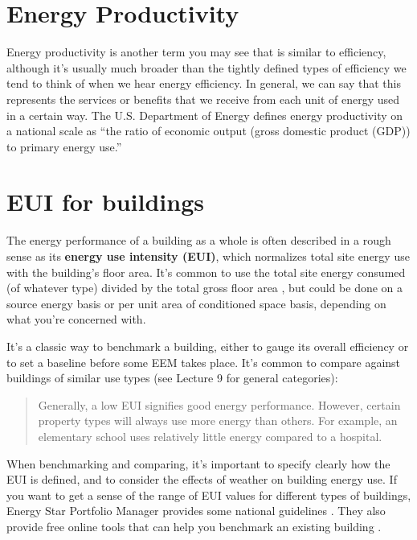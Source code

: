 \documentclass[10pt]{article}
\begin{document}
\section{Energy Productivity}

Energy productivity is another term you may see that is similar to efficiency, although it's usually much broader than the tightly defined types of efficiency we tend to think of when we hear energy efficiency. In general, we can say that this represents the services or benefits that we receive from each unit of energy used in a certain way. The U.S. Department of Energy defines energy productivity on a national scale as ``the ratio of economic output (gross
domestic product (GDP)) to primary energy use.'' \cite{energyproductivity}


\section{EUI for buildings}

The energy performance of a building as a whole is often described in a rough sense as its \textbf{energy use intensity (EUI)}, which normalizes total site energy use with the building's floor area. It's common to use the total site energy consumed (of whatever type) divided by the total gross floor area \cite{noauthor_undated-vw}, but could be done on a source energy basis \cite{noauthor_undated-kb} or per unit area of conditioned space basis, depending on what you're concerned with.

It's a classic way to benchmark a building, either to gauge its overall efficiency or to set a baseline before some EEM takes place. It's common to compare against buildings of similar use types (see Lecture 9 for general categories):

\begin{quote}
    Generally, a low EUI signifies good energy performance. However, certain property types will always use more energy than others. For example, an elementary school uses relatively little energy compared to a hospital. \cite{noauthor_undated-vw}
\end{quote}

When benchmarking and comparing, it's important to specify clearly how the EUI is defined, and to consider the effects of weather on building energy use. If you want to get a sense of the range of EUI values for different types of buildings, Energy Star Portfolio Manager provides some national guidelines \cite{noauthor_2018-ho}. They also provide free online tools that can help you benchmark an existing building \cite{noauthor_undated-aw}.
\end{document}
